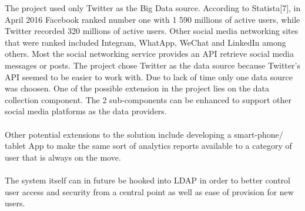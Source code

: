 \documentclass[12pt]{article} %
\begin{document}
	The project used only Twitter as the Big Data source. According to Statista[7], in April 2016 Facebook ranked number one with 1 590 millions of active users, while Twitter recorded 320 millions of active users. Other social media networking sites that were ranked included Integram, WhatApp, WeChat and LinkedIn among others. Most the social networking service provides an API retrieve social media messages or posts. The project chose Twitter as the data source because Twitter's API seemed to be easier to work with. Due to lack of time only one data source was choosen. One of the possible extension in the project lies on the data collection component. The 2 sub-components can be enhanced to support other social media platforms as the data providers.
	\\
	\\
	Other potential extensions to the solution include developing a smart-phone/ tablet App to make the same sort of analytics reports available to a category of user that is always on the move.
	\\
	\\
	The system itself can in future be hooked into LDAP in order to better control user access and security from a central point as well as ease of provision for new users.
	
	
	
	
	
	
	
	
\end{document}
